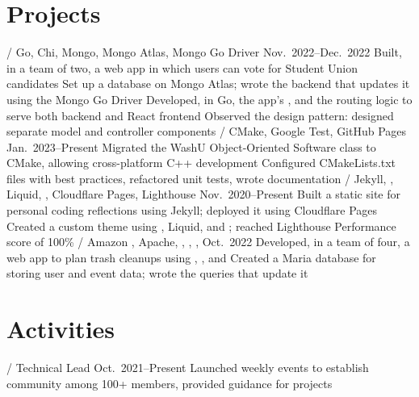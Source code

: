\section{Projects}
\begin{outline}
     / Go, Chi, Mongo, Mongo Atlas, Mongo Go Driver
    \hfill Nov.\ 2022--Dec.\ 2022
        \1 Built, in a team of two, a web app in which users can vote for Student Union candidates
            \2 Set up a database on Mongo Atlas; wrote the backend that updates it using the Mongo Go Driver
            \2 Developed, in Go, the app's  , and the routing logic to serve both backend and React frontend
            \2 Observed the  design pattern: designed separate model and controller components
     / CMake, Google Test, GitHub Pages
    \hfill Jan.\ 2023--Present
        \1 Migrated the WashU Object-Oriented Software class to CMake, allowing cross-platform C++ development
            \2 Configured CMakeLists.txt files with best practices, refactored unit tests, wrote documentation
     / Jekyll, , Liquid, , Cloudflare Pages, Lighthouse
    \hfill Nov.\ 2020--Present
        \1 Built a static site for personal coding reflections using Jekyll; deployed it using Cloudflare Pages
            \2 Created a custom theme using , Liquid, and ; reached Lighthouse Performance score of 100\%
     / Amazon , Apache, , , , 
    \hfill Oct.\ 2022
        \1 Developed, in a team of four, a web app to plan trash cleanups using , , and 
            \2 Created a Maria database for storing user and event data; wrote the  queries that update it
\end{outline}

\section{Activities}
\begin{outline}
     / Technical Lead
    \hfill Oct.\ 2021--Present
        \1 Launched weekly events to establish community among 100+ members, provided guidance for  projects
\end{outline}
